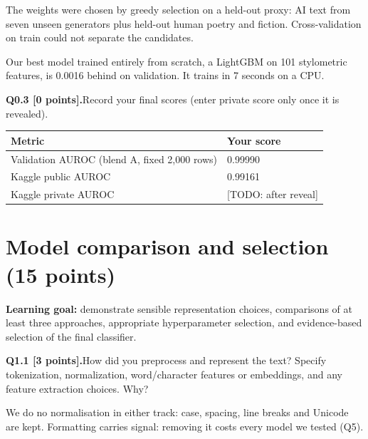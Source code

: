 \documentclass[11pt,letterpaper]{article}
\newcommand{\question}[2]{\needspace{4\baselineskip}\par\addvspace{0.45em}\noindent\textbf{#1}\quad #2\par\nobreak\vspace{0.1em}}
\begin{document}
The weights were chosen by greedy selection on a held-out proxy: AI text from seven unseen generators plus held-out human poetry and fiction. Cross-validation on train could not separate the candidates.

Our best model trained entirely from scratch, a LightGBM on 101 stylometric features, is 0.0016 behind on validation. It trains in 7 seconds on a CPU.

\question{Q0.3 [0 points].}{Record your final scores (enter private score only once it is revealed).}
\begin{tabularx}{\linewidth}{@{}Yp{1.8in}@{}}\toprule Metric & Your score \\ \midrule Validation AUROC (blend A, fixed 2,000 rows) & 0.99990 \\ Kaggle public AUROC & 0.99161 \\ Kaggle private AUROC & [TODO: after reveal] \\ \bottomrule\end{tabularx}

\newpage
\section{Model comparison and selection (15 points)}
\textbf{Learning goal:} demonstrate sensible representation choices, comparisons of at least three approaches, appropriate hyperparameter selection, and evidence-based selection of the final classifier.

\question{Q1.1 [3 points].}{How did you preprocess and represent the text? Specify tokenization, normalization, word/character features or embeddings, and any feature extraction choices. Why?}
We do no normalisation in either track: case, spacing, line breaks and Unicode are kept. Formatting carries signal: removing it costs every model we tested (Q5).
\end{document}
